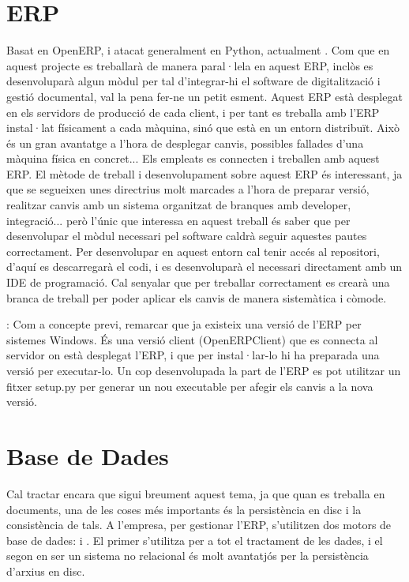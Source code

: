 \documentclass[letterpaper,11pt,catalan]{sphinxmanual}
\begin{document}
\section{ERP}
\label{\detokenize{index:erp}}
Basat en OpenERP, i atacat generalment en Python, actualment . Com que en aquest projecte
es treballarà de manera paral·lela en aquest ERP, inclòs es desenvoluparà algun
mòdul per tal d'integrar-hi el software de digitalització i gestió documental, val la pena
fer-ne un petit esment.
Aquest ERP està desplegat en els servidors de producció de cada
client, i per tant es treballa amb l'ERP instal·lat físicament a cada màquina, sinó
que està en un entorn distribuït. Això és un gran avantatge a l'hora de desplegar canvis, possibles
fallades d'una màquina física en concret... Els empleats es connecten i treballen amb aquest ERP.
El mètode de treball i desenvolupament sobre aquest ERP és interessant, ja que se segueixen
unes directrius molt marcades a l'hora de preparar versió, realitzar canvis amb un sistema
organitzat de branques amb developer, integració... però l'únic que interessa en aquest
treball és saber que per desenvolupar el mòdul necessari pel software caldrà seguir
aquestes pautes correctament.
Per desenvolupar en aquest entorn cal tenir accés al repositori, d'aquí es descarregarà
el codi, i es desenvoluparà el necessari directament amb un IDE de programació. Cal senyalar
que per treballar correctament es crearà una branca de treball per poder aplicar els
canvis de manera sistemàtica i còmode.

: Com a concepte previ, remarcar que ja existeix una versió de l'ERP per sistemes Windows.
És una versió client (OpenERPClient) que es connecta al servidor on està desplegat l'ERP,
i que per instal·lar-lo hi ha preparada una versió  per executar-lo.
Un cop desenvolupada la part de l'ERP es pot utilitzar un fitxer setup.py per generar un
nou executable per afegir els canvis a la nova versió.


\section{Base de Dades}
\label{\detokenize{index:base-de-dades}}
Cal tractar encara que sigui breument aquest tema, ja que quan es treballa en documents,
una de les coses més importants és la persistència en disc i la consistència de tals.
A l'empresa, per gestionar l'ERP, s'utilitzen dos motors de base de dades:  i .
El primer s'utilitza per a tot el tractament de les dades, i el segon en ser un sistema no
relacional és molt avantatjós per la persistència d'arxius en disc.
\end{document}
